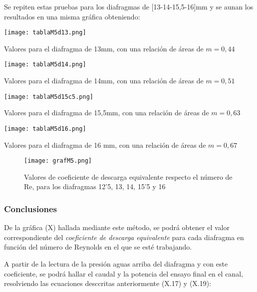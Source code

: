 Se repiten estas pruebas para los diafragmas de {[}13-14-15,5-16{]}mm y
se aunan los resultados en una misma gráfica obteniendo:

\begin{table}
\centering
\texttt{[image: tablaM5d13.png]}
\caption[Valores para el diafragma de $13mm$]{Valores para el diafragma de 13mm, con una relación de áreas de $m=0,44$}
\label{tab:tablaM5d13}
\end{table}

\begin{table}
\centering
\texttt{[image: tablaM5d14.png]}
\caption[Valores para el diafragma de $14mm$]{Valores para el diafragma de 14mm, con una relación de áreas de $m=0,51$}
\label{tab:tablaM5d14}
\end{table}

\begin{table}
\centering
\texttt{[image: tablaM5d15c5.png]}
\caption[Valores para el diafragma de $15,5mm$]{Valores para el diafragma de 15,5mm, con una relación de áreas de $m=0,63$}
\end{table}

\begin{table}
\centering
\texttt{[image: tablaM5d16.png]}
\caption[Valores para el diafragma de $16mm$]{Valores para el diafragma de 16 mm, con una relación de áreas de $m=0,67$}
\end{table}

\begin{figure}
\centering
\texttt{[image: grafM5.png]}
\caption[Valores de coeficiente de descarga equivalente]{Valores de coeficiente de descarga equivalente respecto el número de Re, para los diafragmas 12'5, 13, 14, 15'5 y 16}
\label{fig:grafM5}
\end{figure}

\subsubsection{Conclusiones}\label{header-n498}

De la gráfica (X) hallada mediante este método, se podrá obtener el
valor correspondiente del \emph{coeficiente de descarga equivalente}
para cada diafragma en función del número de Reynolds en el que se esté
trabajando.

A partir de la lectura de la presión aguas arriba del diafragma y con
este coeficiente, se podrá hallar el caudal y la potencia del ensayo
final en el canal, resolviendo las ecuaciones desccritas anteriormente
(X.17) y (X.19):

